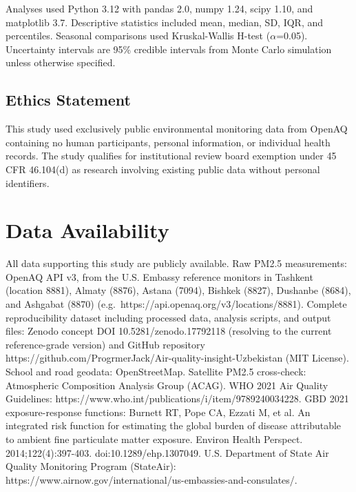\documentclass[11pt,a4paper]{article}
\begin{document}
Analyses used Python 3.12 with pandas 2.0, numpy 1.24, scipy 1.10, and matplotlib 3.7. Descriptive statistics included mean, median, SD, IQR, and percentiles. Seasonal comparisons used Kruskal-Wallis H-test ($\alpha$=0.05). Uncertainty intervals are 95\% credible intervals from Monte Carlo simulation unless otherwise specified.

\subsection{Ethics Statement}

This study used exclusively public environmental monitoring data from OpenAQ containing no human participants, personal information, or individual health records. The study qualifies for institutional review board exemption under 45 CFR 46.104(d) as research involving existing public data without personal identifiers.

\section*{Data Availability}

All data supporting this study are publicly available. Raw PM2.5 measurements: OpenAQ API v3, from the U.S. Embassy reference monitors in Tashkent (location 8881), Almaty (8876), Astana (7094), Bishkek (8827), Dushanbe (8684), and Ashgabat (8870) (e.g.\ https://api.openaq.org/v3/locations/8881). Complete reproducibility dataset including processed data, analysis scripts, and output files: Zenodo concept DOI 10.5281/zenodo.17792118 (resolving to the current reference-grade version) and GitHub repository https://github.com/ProgrmerJack/Air-quality-insight-Uzbekistan (MIT License). School and road geodata: OpenStreetMap. Satellite PM2.5 cross-check: Atmospheric Composition Analysis Group (ACAG). WHO 2021 Air Quality Guidelines: https://www.who.int/publications/i/item/9789240034228. GBD 2021 exposure-response functions: Burnett RT, Pope CA, Ezzati M, et al. An integrated risk function for estimating the global burden of disease attributable to ambient fine particulate matter exposure. Environ Health Perspect. 2014;122(4):397-403. doi:10.1289/ehp.1307049. U.S. Department of State Air Quality Monitoring Program (StateAir): https://www.airnow.gov/international/us-embassies-and-consulates/.

\end{document}
